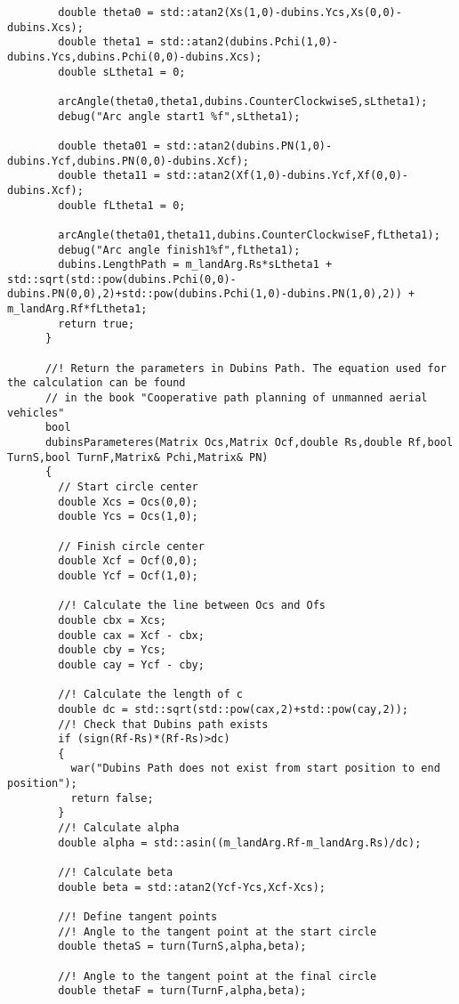 \begin{frame}[fragile]
\begin{lstlisting}
        double theta0 = std::atan2(Xs(1,0)-dubins.Ycs,Xs(0,0)-dubins.Xcs);
        double theta1 = std::atan2(dubins.Pchi(1,0)-dubins.Ycs,dubins.Pchi(0,0)-dubins.Xcs);
        double sLtheta1 = 0;

        arcAngle(theta0,theta1,dubins.CounterClockwiseS,sLtheta1);
        debug("Arc angle start1 %f",sLtheta1);

        double theta01 = std::atan2(dubins.PN(1,0)-dubins.Ycf,dubins.PN(0,0)-dubins.Xcf);
        double theta11 = std::atan2(Xf(1,0)-dubins.Ycf,Xf(0,0)-dubins.Xcf);
        double fLtheta1 = 0;

        arcAngle(theta01,theta11,dubins.CounterClockwiseF,fLtheta1);
        debug("Arc angle finish1%f",fLtheta1);
        dubins.LengthPath = m_landArg.Rs*sLtheta1 + std::sqrt(std::pow(dubins.Pchi(0,0)-dubins.PN(0,0),2)+std::pow(dubins.Pchi(1,0)-dubins.PN(1,0),2)) + m_landArg.Rf*fLtheta1;
        return true;
      }

      //! Return the parameters in Dubins Path. The equation used for the calculation can be found
      // in the book "Cooperative path planning of unmanned aerial vehicles"
      bool
      dubinsParameteres(Matrix Ocs,Matrix Ocf,double Rs,double Rf,bool TurnS,bool TurnF,Matrix& Pchi,Matrix& PN)
      {
        // Start circle center
        double Xcs = Ocs(0,0);
        double Ycs = Ocs(1,0);

        // Finish circle center
        double Xcf = Ocf(0,0);
        double Ycf = Ocf(1,0);

        //! Calculate the line between Ocs and Ofs
        double cbx = Xcs;
        double cax = Xcf - cbx;
        double cby = Ycs;
        double cay = Ycf - cby;

        //! Calculate the length of c
        double dc = std::sqrt(std::pow(cax,2)+std::pow(cay,2));
        //! Check that Dubins path exists
        if (sign(Rf-Rs)*(Rf-Rs)>dc)
        {
          war("Dubins Path does not exist from start position to end position");
          return false;
        }
        //! Calculate alpha
        double alpha = std::asin((m_landArg.Rf-m_landArg.Rs)/dc);

        //! Calculate beta
        double beta = std::atan2(Ycf-Ycs,Xcf-Xcs);

        //! Define tangent points
        //! Angle to the tangent point at the start circle
        double thetaS = turn(TurnS,alpha,beta);

        //! Angle to the tangent point at the final circle
        double thetaF = turn(TurnF,alpha,beta);


\end{lstlisting}
\end{frame}
